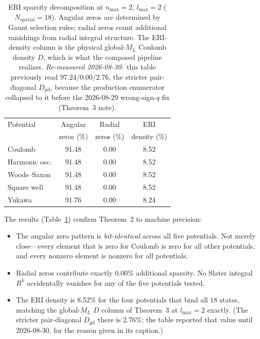 \documentclass[twocolumn,pra,amsmath,amssymb,superscriptaddress]{revtex4-2}
\begin{document}
\begin{table}[b]
\caption{ERI sparsity decomposition at $n_{\max}=2$, $l_{\max}=2$
($N_{\mathrm{spatial}} = 18$).  Angular zeros are determined by
Gaunt selection rules; radial zeros count additional vanishings from
radial integral structure.  The ERI-density column is the physical
global-$M_L$ Coulomb density $D$, which is what the composed pipeline
realizes.  \emph{Re-measured 2026-08-30}:\ this table previously read
$97.24 / 0.00 / 2.76$, the stricter pair-diagonal $D_{\mathrm{pd}}$,
because the production enumerator collapsed to it before the
2026-08-29 wrong-sign-$q$ fix (Theorem~3 note).}
\label{tab:sparsity}
\begin{ruledtabular}
\begin{tabular}{lccc}
Potential & Angular & Radial & ERI \\
          & zeros (\%) & zeros (\%) & density (\%) \\
\midrule
Coulomb        & 91.48 & 0.00 & 8.52 \\
Harmonic osc.  & 91.48 & 0.00 & 8.52 \\
Woods--Saxon   & 91.48 & 0.00 & 8.52 \\
Square well    & 91.48 & 0.00 & 8.52 \\
Yukawa\footnotemark[1] & 91.76 & 0.00 & 8.24 \\
\end{tabular}
\end{ruledtabular}
\end{table}

The results (Table~\ref{tab:sparsity}) confirm Theorem~2 to machine
precision:

\begin{itemize}
\item The angular zero pattern is \textit{bit-identical} across all
  five potentials.  Not merely close---every element that is zero
  for Coulomb is zero for all other potentials, and every nonzero
  element is nonzero for all potentials.
\item Radial zeros contribute exactly $0.00\%$ additional sparsity.
  No Slater integral $R^k$ accidentally vanishes for any of the five
  potentials tested.
\item The ERI density is $8.52\%$ for the four potentials that bind
  all $18$ states, matching the global-$M_L$ $D$ column of Theorem~3 at
  $l_{\max}=2$ exactly.  (The stricter pair-diagonal $D_{\mathrm{pd}}$
  there is $2.76\%$; the table reported that value until 2026-08-30, for
  the reason given in its caption.)
\end{itemize}
\end{document}
